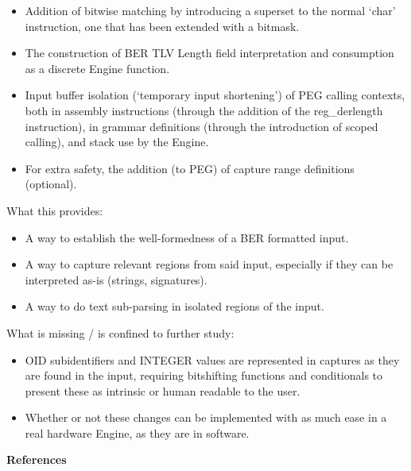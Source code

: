 \begin{itemize}
    \item Addition of bitwise matching by introducing a superset to the 
normal ‘char’ instruction, one that has been extended with a bitmask.
    \item The construction of BER TLV Length field interpretation and 
consumption as a discrete Engine function.
    \item Input buffer isolation (‘temporary input shortening’) of PEG 
calling contexts, both in assembly instructions (through the addition of 
the reg\_derlength instruction), in grammar definitions (through the 
introduction of scoped calling), and stack use by the Engine.
    \item For extra safety, the addition (to PEG) of capture range 
definitions (optional).
\end{itemize}
What this provides:
\begin{itemize}
    \item A way to establish the well-formedness of a BER formatted input.
    \item A way to capture relevant regions from said input, especially if 
they can be interpreted as-is (strings, signatures).
    \item A way to do text sub-parsing in isolated regions of the input.
\end{itemize}
What is missing / is confined to further study:
\begin{itemize}
    \item OID subidentifiers and INTEGER values are represented in captures 
as they are found in the input, requiring bitshifting functions and 
conditionals to present these as intrinsic or human readable to the user.
    \item Whether or not these changes can be implemented with as much ease 
in a real hardware Engine, as they are in software.
\end{itemize}

\newpage
\textbf{References}

\begin{changemargin}{-60mm}{0mm}

\end{changemargin}

\newpage
\begin{appendices}






\end{appendices}
